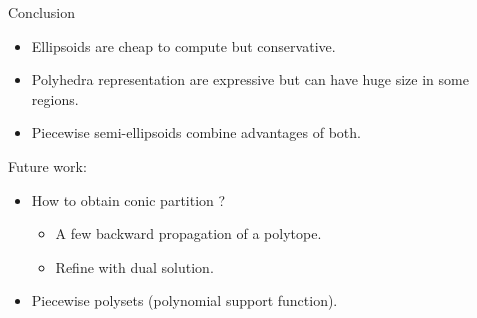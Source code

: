 \documentclass[9pt,notes=hide]{beamer}
\begin{document}
\begin{frame}{Conclusion}
  \begin{itemize}
    \item Ellipsoids are \alert{cheap} to compute but conservative.
    \item Polyhedra representation are \alert{expressive} but can have huge size in some regions.
    \item Piecewise semi-ellipsoids combine \alert{advantages} of both.
  \end{itemize}
  Future work:
  \begin{itemize}
    \item How to obtain conic partition ?
      \begin{itemize}
        \item A few backward propagation of a polytope.
        \item Refine with dual solution.
      \end{itemize}
    \item Piecewise polysets (polynomial support function).
  \end{itemize}
\end{frame}
\end{document}
